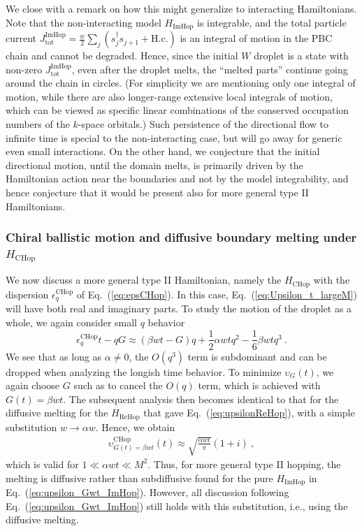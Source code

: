\documentclass[prx,letterpaper,aps,superscriptaddress,floatfix,twocolumn,nofootinbib]{revtex4-2}
\theoremstyle{definition}
\begin{document}
%
We close with a remark on how this might generalize to interacting Hamiltonians.
%
Note that the non-interacting model $H_{\text{ImHop}}$ is integrable, and the total particle current $J_{\text{tot}}^{\text{ImHop}} = \frac{w}{2} \sum_j (s_j^\dagger s_{j+1} + \text{H.c.})$ is an integral of motion in the PBC chain and cannot be degraded.
%
Hence, since the initial $W$ droplet is a state with non-zero $J_{\text{tot}}^{\text{ImHop}}$, even after the droplet melts, the ``melted parts'' continue going around the chain in circles.
%
(For simplicity we are mentioning only one integral of motion, while there are also longer-range extensive local integrals of motion, which can be viewed as specific linear combinations of the conserved occupation numbers of the $k$-space orbitals.)
%
Such persistence of the directional flow to infinite time is special to the non-interacting case, but will go away for generic even small interactions.
%
On the other hand, we conjecture that the initial directional motion, until the domain melts, is primarily driven by the Hamiltonian action near the boundaries and not by the model integrability, and hence conjecture that it would be present also for more general type II Hamiltonians.
%

%
\subsubsection{Chiral ballistic motion and diffusive boundary melting under $H_{\text{CHop}}$}
%
We now discuss a more general type II Hamiltonian, namely the $H_{\text{CHop}}$ with the dispersion $\epsilon_q^{\text{CHop}}$ of Eq.~(\ref{eq:epsCHop}).
%
In this case, Eq.~(\ref{eq:Upsilon_t_largeM}) will have both real and imaginary parts.
%
To study the motion of the droplet as a whole, we again consider small $q$ behavior
\begin{equation}
\epsilon_q^{\text{CHop}} t - q G \approx (\beta w t - G) q + \frac{1}{2}\alpha w t q^2 - \frac{1}{6} \beta w t q^3 ~.
\end{equation}
%
We see that as long as $\alpha \neq 0$, the $O(q^3)$ term is subdominant and can be dropped when analyzing the longish time behavior.
%
To minimize $\upsilon_G(t)$, we again choose $G$ such as to cancel the $O(q)$ term, which is achieved with $G(t) = \beta w t$.
%
The subsequent analysis then becomes identical to that for the diffusive melting for the $H_{\text{ReHop}}$ that gave Eq.~(\ref{eq:upsilonReHop}), with a simple substitution $w \to \alpha w$.
Hence, we obtain
\begin{align}
\upsilon^{\text{CHop}}_{G(t)=\beta w t}(t) \approx \sqrt{\frac{\alpha wt}{\pi}} (1 + i) ~,
\label{eq:upsilon_G_CHop}
\end{align}
which is valid for $1 \ll \alpha w t \ll M^2$.
Thus, for more general type II hopping, the melting is diffusive rather than subdiffusive found for the pure $H_{\text{ImHop}}$ in Eq.~(\ref{eq:upsilon_Gwt_ImHop}).
However, all discussion following Eq.~(\ref{eq:upsilon_Gwt_ImHop}) still holds with this substitution, i.e., using the diffusive melting.
%
\end{document}
